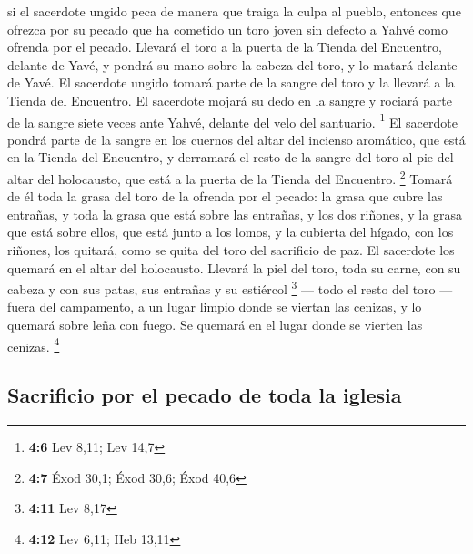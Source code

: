  si el sacerdote ungido peca de manera que traiga la culpa
al pueblo, entonces que ofrezca por su pecado que ha cometido un toro
joven sin defecto a Yahvé como ofrenda por el pecado. 
Llevará el toro a la puerta de la Tienda del Encuentro, delante de Yavé,
y pondrá su mano sobre la cabeza del toro, y lo matará delante de Yavé.
 El sacerdote ungido tomará parte de la sangre del toro y
la llevará a la Tienda del Encuentro.  El sacerdote mojará
su dedo en la sangre y rociará parte de la sangre siete veces ante
Yahvé, delante del velo del santuario. \footnote{\textbf{4:6} Lev 8,11;
  Lev 14,7}  El sacerdote pondrá parte de la sangre en los
cuernos del altar del incienso aromático, que está en la Tienda del
Encuentro, y derramará el resto de la sangre del toro al pie del altar
del holocausto, que está a la puerta de la Tienda del Encuentro.
\footnote{\textbf{4:7} Éxod 30,1; Éxod 30,6; Éxod 40,6} 
Tomará de él toda la grasa del toro de la ofrenda por el pecado: la
grasa que cubre las entrañas, y toda la grasa que está sobre las
entrañas,  y los dos riñones, y la grasa que está sobre
ellos, que está junto a los lomos, y la cubierta del hígado, con los
riñones, los quitará,  como se quita del toro del
sacrificio de paz. El sacerdote los quemará en el altar del holocausto.
 Llevará la piel del toro, toda su carne, con su cabeza y
con sus patas, sus entrañas y su estiércol \footnote{\textbf{4:11} Lev
  8,17}  --- todo el resto del toro --- fuera del
campamento, a un lugar limpio donde se viertan las cenizas, y lo quemará
sobre leña con fuego. Se quemará en el lugar donde se vierten las
cenizas. \footnote{\textbf{4:12} Lev 6,11; Heb 13,11}

\hypertarget{sacrificio-por-el-pecado-de-toda-la-iglesia}{%
\subsection{Sacrificio por el pecado de toda la
iglesia}\label{sacrificio-por-el-pecado-de-toda-la-iglesia}}

